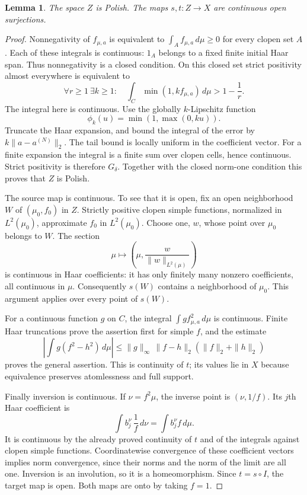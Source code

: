 \documentclass[11pt]{article}
\numberwithin{equation}{section}
\newtheorem{lemma}[theorem]{Lemma}
\theoremstyle{definition}
\begin{document}
\begin{lemma}\label{lem:density-bundle}
The space $Z$ is Polish. The maps $s,t:Z\to X$ are continuous open
surjections.
\end{lemma}
\begin{proof}
Nonnegativity of $f_{\mu,a}$ is equivalent to
$\int_A f_{\mu,a}\,d\mu\ge0$ for every clopen set $A$.
Each of these integrals is continuous: $1_A$ belongs to a fixed finite
initial Haar span. Thus nonnegativity is a closed condition.
On this closed set strict positivity almost everywhere is equivalent to
\[
 \forall r\ge1\ \exists k\ge1:\quad
 \int_C \min(1,k f_{\mu,a})\,d\mu>1-\frac1r.
\]
The integral here is continuous. Use the globally $k$-Lipschitz function
\[
 \phi_k(u)=\min(1,\max(0,ku)).
\]
Truncate the Haar
expansion, and bound the integral of the error by
$k\|a-a^{(N)}\|_2$. The tail bound is locally uniform in the coefficient
vector. For a finite expansion the integral is a finite sum over
clopen cells, hence continuous. Strict positivity is therefore
$G_\delta$. Together with the closed norm-one condition this proves that
$Z$ is Polish.

The source map is continuous. To see that it is open, fix an open
neighborhood $W$ of $(\mu_0,f_0)$ in $Z$. Strictly positive clopen simple
functions, normalized in $L^2(\mu_0)$, approximate $f_0$ in $L^2(\mu_0)$.
Choose one, $w$, whose point over $\mu_0$ belongs to $W$. The section
\begin{equation}\label{eq:measure-star}
\mu\longmapsto
 \left(\mu,\frac{w}{\|w\|_{L^2(\mu)}}\right)
\end{equation}
is continuous in Haar coefficients: it has only finitely many nonzero
coefficients, all continuous in $\mu$. Consequently $s(W)$ contains
a neighborhood of $\mu_0$. This argument applies over every point of
$s(W)$.

For a continuous function $g$ on $C$, the integral
$\int g f_{\mu,a}^2\,d\mu$ is continuous. Finite Haar truncations prove
the assertion first for simple $f$, and the estimate
\[
 \left|\int g(f^2-h^2)\,d\mu\right|
 \le \|g\|_\infty\,\|f-h\|_2(\|f\|_2+\|h\|_2)
\]
proves the general assertion. This is continuity of $t$; its values lie
in $X$ because equivalence preserves atomlessness and full support.

Finally inversion is continuous. If $\nu=f^2\mu$, the inverse point is
$(\nu,1/f)$. Its $j$th Haar coefficient is
\[
 \int b_j^\nu\,\frac1f\,d\nu=\int b_j^\nu f\,d\mu.
\]
It is continuous by the already proved continuity of $t$ and of the
integrals against clopen simple functions. Coordinatewise convergence
of these coefficient vectors implies norm convergence, since their
norms and the norm of the limit are all one. Inversion is an
involution, so it is a homeomorphism. Since $t=s\circ I$, the target
map is open. Both maps are onto by taking $f=1$.
\end{proof}
\end{document}
